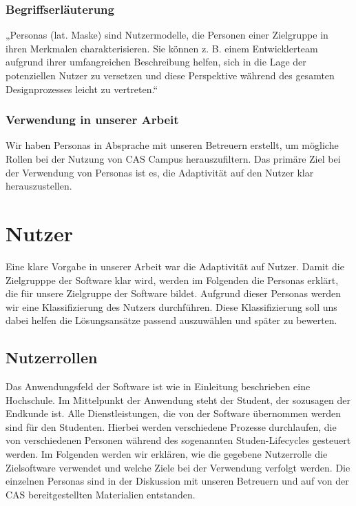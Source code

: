 \subsection{Begriffserläuterung}
„Personas (lat. Maske) sind Nutzermodelle, die Personen einer Zielgruppe in ihren Merkmalen charakterisieren. Sie können z. B. einem Entwicklerteam aufgrund ihrer umfangreichen Beschreibung helfen, sich in die Lage der potenziellen Nutzer zu versetzen und diese Perspektive während des gesamten Designprozesses leicht zu vertreten.“ \cite{personas}

\subsection{Verwendung in unserer Arbeit}
Wir haben Personas in Absprache mit unseren Betreuern erstellt, um mögliche Rollen bei der Nutzung von CAS Campus herauszufiltern. Das primäre Ziel bei der Verwendung von Personas ist es, die Adaptivität auf den Nutzer klar herauszustellen.

\chapter{Nutzer}
Eine klare Vorgabe in unserer Arbeit war die Adaptivität auf Nutzer. Damit die Zielgrupppe der Software klar wird, werden im Folgenden die Personas erklärt, die für unsere Zielgruppe der Software bildet. Aufgrund dieser Personas werden wir eine Klassifizierung des Nutzers durchführen. Diese Klassifizierung soll uns dabei helfen die Lösungsansätze passend auszuwählen und später zu bewerten.


\section{Nutzerrollen}
Das Anwendungsfeld der Software ist wie in Einleitung beschrieben eine Hochschule. Im Mittelpunkt der Anwendung steht der Student, der sozusagen der Endkunde ist. Alle Dienstleistungen, die von der Software übernommen werden sind für den Studenten. Hierbei werden verschiedene Prozesse durchlaufen, die von verschiedenen Personen während des sogenannten Studen-Lifecycles gesteuert werden. Im Folgenden werden wir erklären, wie die gegebene Nutzerrolle die Zielsoftware verwendet und welche Ziele bei der Verwendung verfolgt werden. Die einzelnen Personas sind in der Diskussion mit unseren Betreuern und auf von der CAS bereitgestellten Materialien entstanden.


